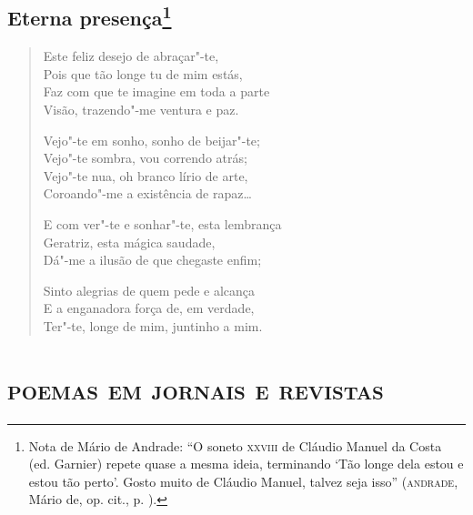 \chapter{Eterna presença\footnote[*]{Nota de Mário de Andrade: ``O soneto
  \textsc{xxviii} de Cláudio Manuel da Costa (ed. Garnier) repete quase a mesma
  ideia, terminando `Tão longe dela estou e estou tão perto'. Gosto
  muito de Cláudio Manuel, talvez seja isso'' (\textsc{andrade}, Mário de, op.
  cit., p. ).}}

\begin{verse}
Este feliz desejo de abraçar"-te,\\
Pois que tão longe tu de mim estás,\\
Faz com que te imagine em toda a parte\\
Visão, trazendo"-me ventura e paz.

Vejo"-te em sonho, sonho de beijar"-te;\\
Vejo"-te sombra, vou correndo atrás;\\
Vejo"-te nua, oh branco lírio de arte,\\
Coroando"-me a existência de rapaz\ldots{}

E com ver"-te e sonhar"-te, esta lembrança\\
Geratriz, esta mágica saudade,\\
Dá"-me a ilusão de que chegaste enfim;

Sinto alegrias de quem pede e alcança\\
E a enganadora força de, em verdade,\\
Ter"-te, longe de mim, juntinho a mim.
\end{verse}

\movetooddpage
{}
\part*{\textsc{poemas em jornais e revistas}}



